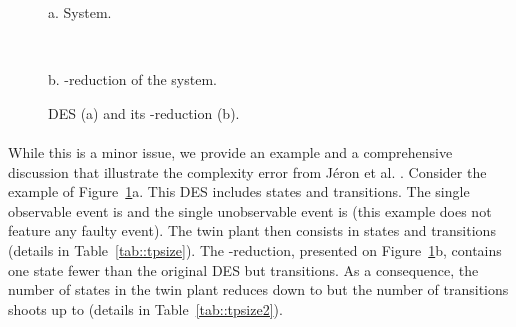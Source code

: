 \documentclass{article}
\begin{document}
\begin{figure}[ht]
  \begin{minipage}{0.47\linewidth}
  \begin{center}
    {a. System.}
  \end{center}
  \end{minipage}\begin{minipage}{0.06\linewidth}
  \ 
  \end{minipage}\begin{minipage}{0.47\linewidth}
  \begin{center}
    {b. -reduction of the system.}
  \end{center}
  \end{minipage}
  \caption{DES (a) and its -reduction (b).}
  \label{fig::quadra}
\end{figure}

\paragraph{}
While this is a minor issue, 
we provide an example and a comprehensive discussion 
that illustrate the complexity error from J\'eron et al. 
\cite{jeron-etal::wc::08}.  
Consider the example of Figure~\ref{fig::quadra}a.  
This DES includes  states and  transitions.  
The single observable event is  
and the single unobservable event is  
(this example does not feature any faulty event).  
The twin plant then consists in  states and  transitions 
(details in Table~\ref{tab::tpsize}).  
The -reduction, presented on Figure~\ref{fig::quadra}b, 
contains one state fewer than the original DES 
but  transitions.  
As a consequence, the number of states in the twin plant 
reduces down to  
but the number of transitions shoots up to   
(details in Table~\ref{tab::tpsize2}).  
\end{document}
